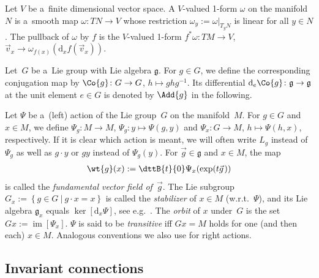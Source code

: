\documentclass[pdftex]{sigma}
\numberwithin{equation}{section}
\begin{document}
Let $V$ be a~f\/inite dimensional vector space.
A $V$-valued 1-form $\omega$ on the manifold $N$ is a~smooth map $\omega\colon TN\rightarrow V$ whose restriction
$\omega_y:=\omega|_{T_yN}$ is linear for all $y\in N$.
The pullback of $\omega$ by $f$ is the $V$-valued 1-form $f^{*}\omega\colon TM\rightarrow V$, $\vec{v}_x\rightarrow
\omega_{f(x)}(\mathrm{d}_xf(\vec{v}_x))$.

Let~$G$ be a~Lie group with Lie algebra $\mathfrak{g}$.
For $g\in G$, we def\/ine the corresponding conjugation map by $\Co{g}\colon G\rightarrow G$, $h\mapsto g h g^{-1}$.
Its dif\/ferential $\mathrm{d}_e\Co{g}\colon \mathfrak{g}\rightarrow \mathfrak{g}$ at the unit element $e\in G$ is denoted
by $\Add{g}$ in the following.

Let $\Psi$ be a~(left) action of the Lie group~$G$ on the manifold~$M$.
For $g\in G$ and $x\in M$, we define $\Psi_g\colon M\rightarrow M$, $\Psi_g\colon y\mapsto \Psi(g,y)$ and $\Psi_x\colon G\rightarrow M$, $h\mapsto\Psi(h,x)$, respectively. If it is clear which action is meant, we will often write $L_g$ instead of $\Psi_g$ as well as $g\cdot y$ or $g y$ instead of $\Psi_g(y)$. For $\vec{g}\in \mathfrak{g}$ and $x\in M$, the map
\begin{gather*}
\wt{g}(x):=\dttB{t}{0} \Psi_x(\exp(t\vec{g}\hspace{1pt}))
\end{gather*}
is called the
\emph{fundamental vector field of~$\vec{g}$}.
The Lie subgroup $G_x:=\left\{g\in G\: \big| \: g\cdot x=x\right\}$ is called the \emph{stabilizer} of $x\in M$
(w.r.t.~$\Psi$), and its Lie algebra $\mathfrak{g}_x$ equals $\ker[\mathrm{d}_x\Psi]$, see e.g.~\cite{DuisKolk}.
The \emph{orbit} of $x$ under~$G$ is the set $Gx:=\operatorname{\mathrm{im}}[\Psi_x]$. $\Psi$ is said to be
\emph{transitive} if\/f $Gx=M$ holds for one (and then each) $x\in M$.
Analogous conventions we also use for right actions.

\subsection{Invariant connections}\label{subsec:InvConn}
\end{document}
